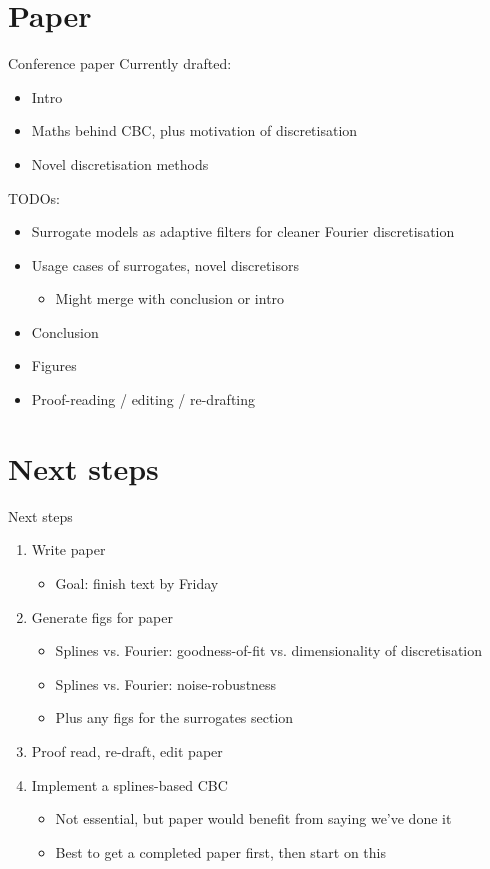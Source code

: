 \documentclass[presentation]{beamer}
\begin{document}
\section{Paper}
\label{sec:org985d764}
\begin{frame}[plain,label={sec:orgd66ee85}]{Conference paper}
Currently drafted:
\begin{itemize}
\item Intro
\item Maths behind CBC, plus motivation of discretisation
\item Novel discretisation methods
\end{itemize}
\vfill
TODOs:
\begin{itemize}
\item Surrogate models as adaptive filters for cleaner Fourier discretisation
\item Usage cases of surrogates, novel discretisors
\begin{itemize}
\item Might merge with conclusion or intro
\end{itemize}
\item Conclusion
\item Figures
\item Proof-reading / editing / re-drafting
\end{itemize}
\end{frame}
\section{Next steps}
\label{sec:org8d6d70b}
\begin{frame}[label={sec:org7b5bc31}]{Next steps}
\begin{enumerate}
\item Write paper
\begin{itemize}
\item Goal: finish text by Friday
\end{itemize}
\item Generate figs for paper
\begin{itemize}
\item Splines vs. Fourier: goodness-of-fit vs. dimensionality of discretisation
\item Splines vs. Fourier: noise-robustness
\item Plus any figs for the surrogates section
\end{itemize}
\item Proof read, re-draft, edit paper
\item Implement a splines-based CBC
\begin{itemize}
\item Not essential, but paper would benefit from saying we've done it
\item Best to get a completed paper first, then start on this
\end{itemize}
\end{enumerate}
\end{frame}
\end{document}
